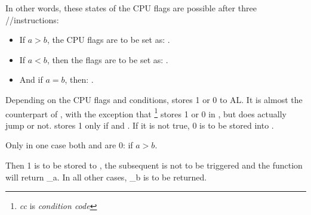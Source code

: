 In other words, these states of the CPU flags are possible
after three \\
\FUCOMPP/\FNSTSW/\SAHF instructions:

\begin{itemize}
\item If $a>b$, the CPU flags are to be set as: .
\item If $a<b$, then the flags are to be set as: .
\item And if $a=b$, then: .
\end{itemize}


Depending on the CPU flags and conditions, \SETNBE stores 1 or 0 to AL. 
It is almost the counterpart of \JNBE, with the exception that \SETcc 
\footnote{\emph{cc} is \emph{condition code}} stores 1 or 0 in \AL, 
but \Jcc does actually jump or not. 
\SETNBE stores 1 only if  and . 
If it is not true, 0 is to be stored into \AL.

Only in one case both \CF and \ZF are 0: if $a>b$.

Then 1 is to be stored to \AL, the subsequent \JZ is not to be triggered and the function will return {\_a}. 
In all other cases, {\_b} is to be returned.

